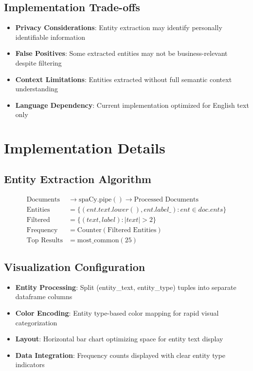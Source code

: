\documentclass[11pt]{article}
\begin{document}
\subsection{Implementation Trade-offs}
\begin{itemize}
\item \textbf{Privacy Considerations}: Entity extraction may identify personally identifiable information
\item \textbf{False Positives}: Some extracted entities may not be business-relevant despite filtering
\item \textbf{Context Limitations}: Entities extracted without full semantic context understanding
\item \textbf{Language Dependency}: Current implementation optimized for English text only
\end{itemize}

\section{Implementation Details}

\subsection{Entity Extraction Algorithm}
\begin{align}
\text{Documents} &\rightarrow \text{spaCy.pipe}() \rightarrow \text{Processed Documents} \\
\text{Entities} &= \{(ent.text.lower(), ent.label\_) : ent \in doc.ents\} \\
\text{Filtered} &= \{(text, label) : |text| > 2\} \\
\text{Frequency} &= \text{Counter}(\text{Filtered Entities}) \\
\text{Top Results} &= \text{most\_common}(25)
\end{align}

\subsection{Visualization Configuration}
\begin{itemize}
\item \textbf{Entity Processing}: Split (entity\_text, entity\_type) tuples into separate dataframe columns
\item \textbf{Color Encoding}: Entity type-based color mapping for rapid visual categorization
\item \textbf{Layout}: Horizontal bar chart optimizing space for entity text display
\item \textbf{Data Integration}: Frequency counts displayed with clear entity type indicators
\end{itemize}
\end{document}
